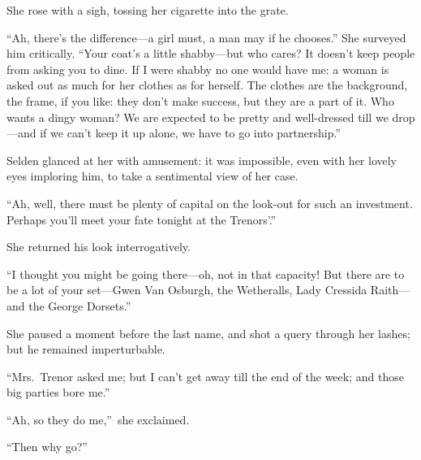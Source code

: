 \documentclass[12pt,a4paper]{book}
\begin{document}
She rose with a sigh, tossing her cigarette into the grate.





``Ah, there's the difference---a girl must, a man may if he
chooses.'' She surveyed him critically. ``Your coat's a little
shabby---but who cares? It doesn't keep people from asking you to
dine. If I were shabby no one would have me: a woman is asked out
as much for her clothes as for herself. The clothes are the
background, the frame, if you like: they don't make success, but
they are a part of it. Who wants a dingy woman? We are expected
to be pretty and well-dressed till we drop---and if we can't keep
it up alone, we have to go into partnership.''





Selden glanced at her with amusement: it was impossible, even
with her lovely eyes imploring him, to take a sentimental view of
her case.





``Ah, well, there must be plenty of capital on the look-out for
such an investment. Perhaps you'll meet your fate tonight at the
Trenors'.''





She returned his look interrogatively.





``I thought you might be going there---oh, not in that capacity! 
But there are to be a lot of your set---Gwen Van Osburgh, the
Wetheralls, Lady Cressida Raith---and the George Dorsets.''





She paused a moment before the last name, and shot a query
through her lashes; but he remained imperturbable.





``Mrs.\ Trenor asked me; but I can't get away till the end of the
week; and those big parties bore me.''





``Ah, so they do me,''\ she exclaimed.





``Then why go?''
\end{document}
